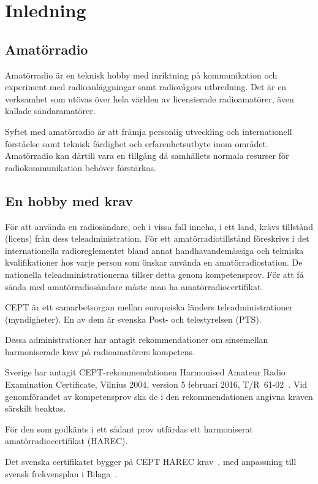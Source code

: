 \chapter*{Inledning}

\section*{Amatörradio}

Amatörradio är en teknisk hobby med inriktning på kommunikation och experiment
med radioanläggningar samt radiovågors utbredning.
Det är en verksamhet som utövas över hela världen av licensierade radioamatörer,
även kallade sändaramatörer.

Syftet med amatörradio är att främja personlig utveckling och internationell
förståelse samt teknisk färdighet och erfarenhetsutbyte inom området.
Amatörradio kan därtill vara en tillgång då samhällets normala resurser för
radiokommunikation behöver förstärkas.

\section*{En hobby med krav}

För att använda en radiosändare, och i vissa fall inneha, i ett land, krävs
tillstånd (licens) från dess teleadministration.
För ett amatörradiotillstånd föreskrivs i det internationella radioreglementet
\cite{ITU-RR} bland annat handhavandemässiga och tekniska kvalifikationer hos
varje person som önskar använda en amatörradiostation.
De nationella teleadministrationerna tillser detta genom kompetensprov.
För att få sända med amatörradiosändare måste man ha amatörradiocertifikat.

CEPT är ett samarbetsorgan mellan europeiska länders teleadministrationer
(myndigheter).
En av dem är svenska Post- och telestyrelsen (PTS).

Dessa administrationer har antagit rekommendationer om sinsemellan
harmoniserade krav på radioamatörers kompetens.

Sverige har antagit CEPT-rekom\-men\-da\-ti\-on\-en
 Ha\-rmonised Amateur Radio Examination
Certificate, Vilnius 2004, version 5 februari 2016, T/R~61-02~\cite{TR6102}.
Vid genomförandet av kompetensprov ska de i den rekommendationen
angivna kraven särskilt beaktas.

För den som godkänts i ett sådant prov utfärdas ett harmoniserat
amatörradiocertifikat (HAREC).

Det svenska certifikatet bygger på CEPT HAREC krav~\cite{TR6102},
med anpassning till svensk frekvensplan i Bilaga~.

